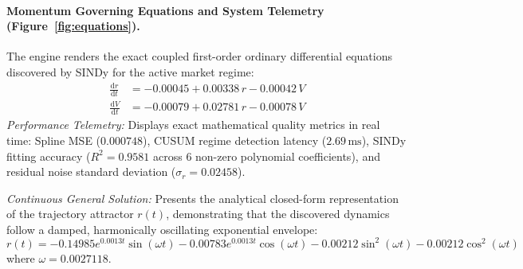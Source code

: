 \documentclass[11pt,a4paper]{article}
\begin{document}
\paragraph{Momentum Governing Equations and System Telemetry (Figure~\ref{fig:equations}).}
The engine renders the exact coupled first-order ordinary differential equations discovered by SINDy for the active market regime:
\begin{align}
    \frac{\mathrm{d}r}{\mathrm{d}t} &= -0.00045 + 0.00338\,r - 0.00042\,V \\
    \frac{\mathrm{d}V}{\mathrm{d}t} &= -0.00079 + 0.02781\,r - 0.00078\,V
\end{align}
\textit{Performance Telemetry:} Displays exact mathematical quality metrics in real time: Spline MSE ($0.000748$), CUSUM regime detection latency ($2.69\,\text{ms}$), SINDy fitting accuracy ($R^2 = 0.9581$ across 6 non-zero polynomial coefficients), and residual noise standard deviation ($\sigma_r = 0.02458$).

\textit{Continuous General Solution:} Presents the analytical closed-form representation of the trajectory attractor $r(t)$, demonstrating that the discovered dynamics follow a damped, harmonically oscillating exponential envelope:
\begin{equation}
    r(t) = -0.14985 e^{0.0013 t} \sin(\omega t) - 0.00783 e^{0.0013 t} \cos(\omega t) - 0.00212 \sin^2(\omega t) - 0.00212 \cos^2(\omega t)
\end{equation}
where $\omega = 0.0027118$.




\end{document}

